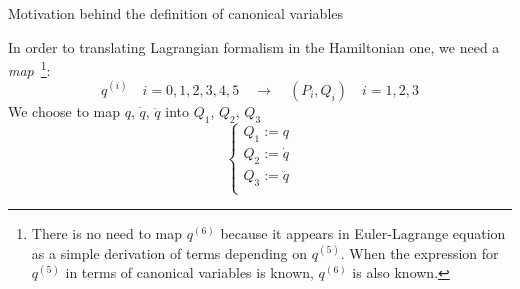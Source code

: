 \documentclass[10pt]{beamer}
\begin{document}
  \begin{frame}{Motivation behind the definition of canonical variables}
    \begin{alertblock}{}
      In order to translating Lagrangian formalism in the Hamiltonian one, we
      need a \emph{map}~\footnote{
        There is no need to map $q^{(6)}$ because it appears in Euler-Lagrange
        equation as a simple derivation of terms depending on $q^{(5)}$. When
        the expression for $q^{(5)}$ in terms of canonical variables is known,
        $q^{(6)}$ is also known.
      }:
      \begin{equation*}
        q^{(i)} \quad i = 0, 1, 2, 3, 4, 5
        \quad \longrightarrow \quad
        (P_i , Q_i) \quad i = 1, 2, 3
      \end{equation*}
      We choose to map $q$, $\dot{q}$, $\ddot{q}$ into $Q_1$, $Q_2$, $Q_3$
      \begin{equation*}\label{eq:def_Q}
        \begin{cases}
          Q_1 := q \\
          Q_2 := \dot{q} \\
          Q_3 := \ddot{q} \\
        \end{cases}
      \end{equation*}
    \end{alertblock}
  \end{frame}
\end{document}
